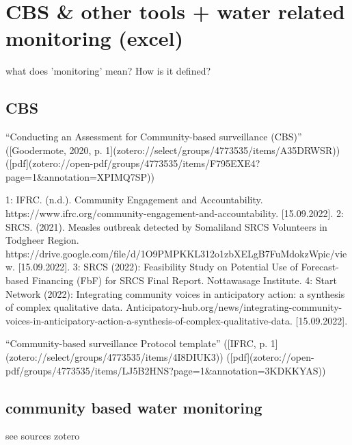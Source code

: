 {%


\section{CBS & other tools + water related monitoring (excel)}

what does 'monitoring' mean? How is it defined?

\subsection{CBS}

“Conducting an Assessment for Community-based surveillance (CBS)” ([Goodermote, 2020, p. 1](zotero://select/groups/4773535/items/A35DRWSR)) ([pdf](zotero://open-pdf/groups/4773535/items/F795EXE4?page=1&annotation=XPIMQ7SP))

1: IFRC. (n.d.). Community Engagement and Accountability. https://www.ifrc.org/community-engagement-and-accountability. [15.09.2022].
2: SRCS. (2021). Measles outbreak detected by Somaliland SRCS Volunteers in Todgheer Region. https://drive.google.com/file/d/1O9PMPKKL312o1zbXELgB7FuMdokzWpic/view. [15.09.2022].
3: SRCS (2022): Feasibility Study on Potential Use of Forecast-based Financing (FbF) for SRCS Final Report. Nottawasage Institute.
4: Start Network (2022): Integrating community voices in anticipatory action: a synthesis of complex qualitative data. Anticipatory-hub.org/news/integrating-community-voices-in-anticipatory-action-a-synthesis-of-complex-qualitative-data. [15.09.2022].

“Community-based surveillance Protocol template” ([IFRC, p. 1](zotero://select/groups/4773535/items/4I8DIUK3)) ([pdf](zotero://open-pdf/groups/4773535/items/LJ5B2HNS?page=1&annotation=3KDKKYAS))



\subsection{community based water monitoring}
see sources zotero

}
